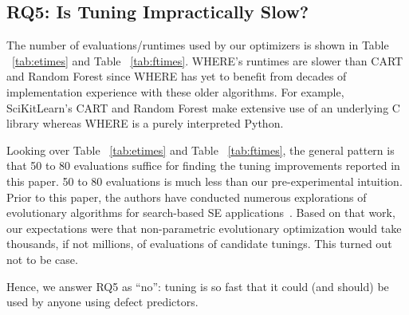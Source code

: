 \documentclass{sig-alternative}
\newcommand{\tab}[1]{Table ~\ref{tab:#1}}
\begin{document}
\subsection{RQ5: Is Tuning Impractically Slow?}\label{sect:fast}
 
 
The number of evaluations/runtimes used by our optimizers is shown in \tab{etimes}
and \tab{ftimes}.
WHERE's runtimes are slower than CART and Random Forest since WHERE has yet to benefit from decades
of implementation experience with these older algorithms. For example, SciKitLearn's  CART and Random Forest
 make extensive use of an underlying C library whereas WHERE is a purely interpreted Python.

Looking over \tab{etimes} and \tab{ftimes}, the general pattern is that 50 to 80 evaluations suffice for finding the tuning
improvements reported in this paper. 
50 to 80 evaluations is  much less than our pre-experimental intuition.
Prior to this paper, the authors have conducted numerous explorations of evolutionary algorithms
for search-based SE applications~\cite{krall15,krall15:hm,fea02a,me07f,Green}. Based
on that work, our expectations were that non-parametric evolutionary optimization would
take thousands, if not millions, of evaluations of candidate tunings. This turned out not
to be case.

Hence, we answer RQ5 as ``no'': tuning is so fast that
it could (and should) be used by anyone using defect predictors. 
\end{document}
